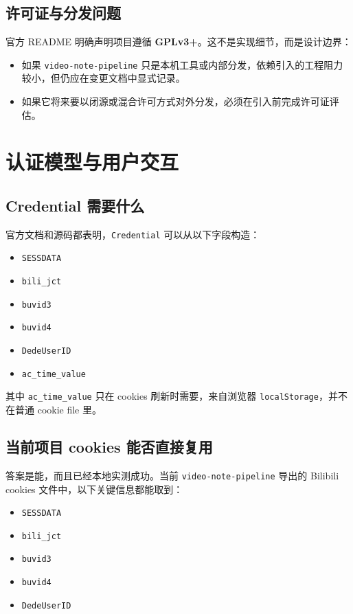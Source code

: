 \documentclass[a4paper]{article}
\begin{document}
\subsection{许可证与分发问题}

官方 README 明确声明项目遵循 \textbf{GPLv3+}。这不是实现细节，而是设计边界：
\begin{itemize}
\item 如果 \texttt{video-note-pipeline} 只是本机工具或内部分发，依赖引入的工程阻力较小，但仍应在变更文档中显式记录。
\item 如果它将来要以闭源或混合许可方式对外分发，必须在引入前完成许可证评估。
\end{itemize}

\section{认证模型与用户交互}

\subsection{Credential 需要什么}

官方文档和源码都表明，\texttt{Credential} 可以从以下字段构造：
\begin{itemize}
\item \texttt{SESSDATA}
\item \texttt{bili\_jct}
\item \texttt{buvid3}
\item \texttt{buvid4}
\item \texttt{DedeUserID}
\item \texttt{ac\_time\_value}
\end{itemize}

其中 \texttt{ac\_time\_value} 只在 cookies 刷新时需要，来自浏览器 \texttt{localStorage}，并不在普通 cookie file 里。

\subsection{当前项目 cookies 能否直接复用}

答案是能，而且已经本地实测成功。当前 \texttt{video-note-pipeline} 导出的 Bilibili cookies 文件中，以下关键信息都能取到：
\begin{itemize}
\item \texttt{SESSDATA}
\item \texttt{bili\_jct}
\item \texttt{buvid3}
\item \texttt{buvid4}
\item \texttt{DedeUserID}
\end{itemize}
\end{document}
